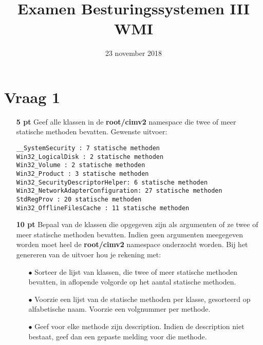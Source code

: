 \documentclass{article}
\begin{document}
\title{Examen Besturingssystemen III WMI}
\date{ 23 november 2018}
\author{}
\maketitle

\section*{Vraag 1} 
\begin{itemize}
    \item[\textbf{5 pt}] Geef alle klassen in de \textbf{root/cimv2} namespace die twee of meer statische methoden bevatten. Gewenste uitvoer:
        \begin{lstlisting}
__SystemSecurity : 7 statische methoden
Win32_LogicalDisk : 2 statische methoden
Win32_Volume : 2 statische methoden
Win32_Product : 3 statische methoden
Win32_SecurityDescriptorHelper: 6 statische methoden
Win32_NetworkAdapterConfiguration: 27 statische methoden
StdRegProv : 20 statische methoden
Win32_OfflineFilesCache : 11 statische methoden
        \end{lstlisting}
    \item[\textbf{10 pt}] Bepaal van de klassen die opgegeven zijn als argumenten of ze twee of meer statische methoden bevatten. Indien geen argumenten meegegeven worden moet heel de \textbf{root/cimv2} namespace onderzocht worden. Bij het genereren van de uitvoer hou je rekening met:
    \begin{itemize}
        \item[$\bullet$] Sorteer de lijst van klassen, die twee of meer statische methoden bevatten, in aflopende volgorde op het aantal statische methoden.
        \item[$\bullet$] Voorzie een lijst van de statische methoden per klasse, gesorteerd op alfabetische naam. Voorzie een volgnummer per methode.
        \item[$\bullet$] Geef voor elke methode zijn description. Indien de description niet bestaat, geef dan een gepaste melding voor die methode.
    \end{itemize}
\end{itemize}
\end{document}
